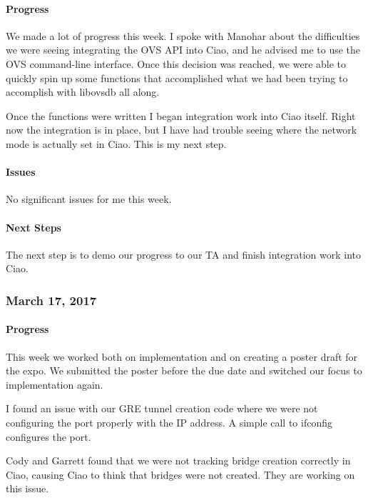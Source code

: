 \documentclass[10pt,onecolumn,journal,draftclsnofoot]{IEEEtran}
\begin{document}
\paragraph{Progress} 

We made a lot of progress this week. I spoke with Manohar about the
difficulties we were seeing integrating the OVS API into Ciao, and he
advised me to use the OVS command-line interface. Once this decision was
reached, we were able to quickly spin up some functions that
accomplished what we had been trying to accomplish with libovsdb all
along.

Once the functions were written I began integration work into Ciao
itself. Right now the integration is in place, but I have had trouble
seeing where the network mode is actually set in Ciao. This is my next
step.

\paragraph{Issues} 

No significant issues for me this week.

\paragraph{Next Steps} 

The next step is to demo our progress to our TA and finish integration
work into Ciao.

\subsubsection{March 17, 2017} 

\paragraph{Progress} 

This week we worked both on implementation and on creating a poster
draft for the expo. We submitted the poster before the due date and
switched our focus to implementation again.

I found an issue with our GRE tunnel creation code where we were not
configuring the port properly with the IP address. A simple call to
ifconfig configures the port.

Cody and Garrett found that we were not tracking bridge creation
correctly in Ciao, causing Ciao to think that bridges were not created.
They are working on this issue.
\end{document}
